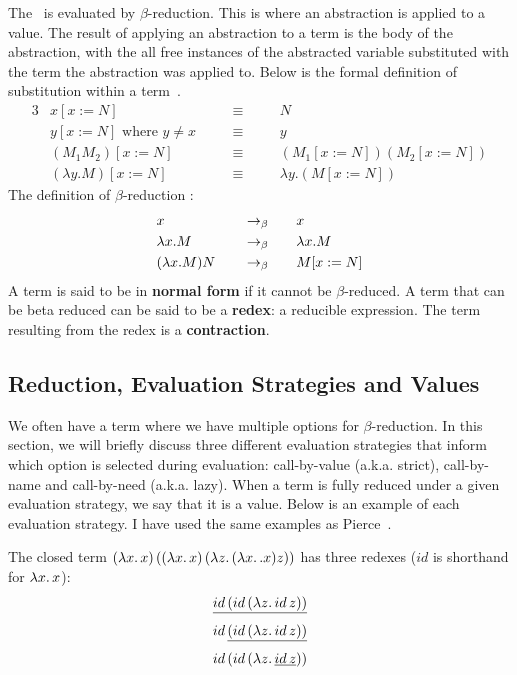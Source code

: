 \noindent The \lcalc\ is evaluated by $\beta$-reduction. This is where an abstraction is applied to a value. The result of applying an abstraction to a term is the body of the abstraction, with the all free instances of the abstracted variable substituted with the term the abstraction was applied to. Below is the formal definition of substitution within a term~\cite{barendregt2013lambda}. 
\noindent\begin{alignat*}{3}
&x[x:=N]                        \quad && \equiv \quad && N                       \\
&y[x:=N] \text{ where } y \ne x \quad && \equiv \quad && y                       \\
&(M_1 M_2)[x:=N]                \quad && \equiv \quad && (M_1[x:=N]) (M_2[x:=N]) \\
&(\lambda y.M)[x:=N]            \quad && \equiv \quad && \lambda y.(M[x:=N])     
\end{alignat*}  
\noindent The definition of $\beta$-reduction \cite{barendregt2013lambda}:
\begin{alignat*}{3}
&x                 \quad && \rightarrow_\beta \quad &&        x           \\
&\lambda x.M       \quad && \rightarrow_\beta \quad &&        \lambda x.M \\
&(\lambda x.M) N   \quad && \rightarrow_\beta \quad &&        M[x:=N]
\end{alignat*}
A term is said to be in \textbf{normal form} if it cannot be $\beta$-reduced. A term that can be beta reduced can be said to be a \textbf{redex}: a reducible expression. The term resulting from the redex is a \textbf{contraction}.

\subsection{Reduction, Evaluation Strategies and Values}
\label{bg:eval_strategies}
We often have a term where we have multiple options for $\beta$-reduction. In this section, we will briefly discuss three different evaluation strategies that inform which option is selected during evaluation: call-by-value (a.k.a. strict), call-by-name and call-by-need (a.k.a. lazy). When a term is fully reduced under a given evaluation strategy, we say that it is a value. Below is an example of each evaluation strategy. I have used the same examples as Pierce~\cite{pierce2002types}. 

The closed term 
\((\lambda x.\, x)\,((\lambda x.\, x)\,(\lambda z.\, (\lambda x.\,. x) z))\) has three redexes ($id$ is shorthand for $\lambda x.\, x$):
\[\underline{id\,(id\,(\lambda z.\, id\,z))}\]
\[id\,\underline{(id\,(\lambda z.\, id\,z))}\]
\[id\,(id\,(\lambda z.\, \underline{id\,z}))\]

